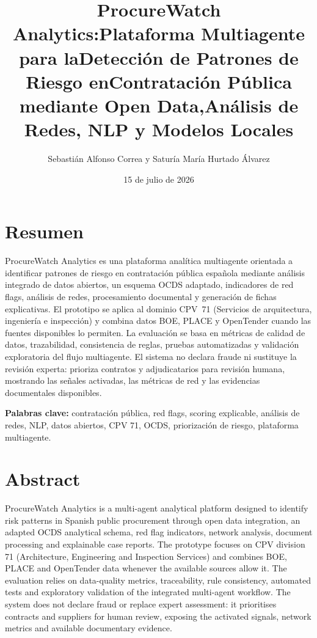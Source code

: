 \documentclass[11pt,a4paper,spanish]{book}
\title{ProcureWatch Analytics:\newline Plataforma Multiagente para la\newline Detecci{\'o}n de Patrones de Riesgo en\newline Contrataci{\'o}n P{\'u}blica mediante Open Data,\newline An{\'a}lisis de Redes, NLP y Modelos Locales}
\author{Sebasti{\'a}n Alfonso Correa y Satur{\'i}a Mar{\'i}a Hurtado {\'A}lvarez}
\date{15 de julio de 2026}
\numberwithin{equation}{chapter}
\numberwithin{figure}{chapter}
\begin{document}
\makeatletter
\@twosidefalse
\@mparswitchfalse
\makeatother
\renewcommand{\listfigurename}{\'Indice de Ilustraciones}
\renewcommand{\listtablename}{\'Indice de Tablas}
\renewcommand{\contentsname}{\'Indice de Contenidos}
\renewcommand{\figurename}{Figura}
\renewcommand{\tablename}{Tabla}

\maketitle
\frontmatter
\tableofcontents
\listoffigures
\listoftables

\chapter{Resumen}

ProcureWatch Analytics es una plataforma anal{\'i}tica multiagente orientada a identificar patrones de riesgo en contrataci{\'o}n p{\'u}blica espa{\~n}ola mediante an{\'a}lisis integrado de datos abiertos, un esquema OCDS adaptado, indicadores de red flags, an{\'a}lisis de redes, procesamiento documental y generaci{\'o}n de fichas explicativas. El prototipo se aplica al dominio CPV~71 (Servicios de arquitectura, ingenier{\'i}a e inspecci{\'o}n) y combina datos BOE, PLACE y OpenTender cuando las fuentes disponibles lo permiten. La evaluaci{\'o}n se basa en m{\'e}tricas de calidad de datos, trazabilidad, consistencia de reglas, pruebas automatizadas y validaci{\'o}n exploratoria del flujo multiagente. El sistema no declara fraude ni sustituye la revisi{\'o}n experta: prioriza contratos y adjudicatarios para revisi{\'o}n humana, mostrando las se{\~n}ales activadas, las m{\'e}tricas de red y las evidencias documentales disponibles.

\medskip
{\bf Palabras clave:} contrataci{\'o}n p{\'u}blica, red flags, scoring explicable, an{\'a}lisis de redes, NLP, datos abiertos, CPV 71, OCDS, priorizaci{\'o}n de riesgo, plataforma multiagente.

\chapter{Abstract}

ProcureWatch Analytics is a multi-agent analytical platform designed to identify risk patterns in Spanish public procurement through open data integration, an adapted OCDS analytical schema, red flag indicators, network analysis, document processing and explainable case reports. The prototype focuses on CPV division 71 (Architecture, Engineering and Inspection Services) and combines BOE, PLACE and OpenTender data whenever the available sources allow it. The evaluation relies on data-quality metrics, traceability, rule consistency, automated tests and exploratory validation of the integrated multi-agent workflow. The system does not declare fraud or replace expert assessment: it prioritises contracts and suppliers for human review, exposing the activated signals, network metrics and available documentary evidence.
\end{document}
